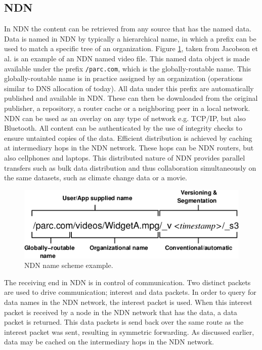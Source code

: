 

\subsection{NDN}
\label{overview-ndn}
In NDN the content can be retrieved from any source that has the named data. Data is named in NDN by typically a hierarchical name, in which a prefix can be used to match a specific tree of an organization.  Figure \ref{fig:ndn_name}, taken from Jacobson et al. \cite{jacobson2009networking} is an example of an NDN named video file. This named data object is made available under the prefix \texttt{/parc.com}, which is the globally-routable name. This globally-routable name is in practice assigned by an organization (operations similar to DNS allocation of today). All data under this prefix are automatically published and available in NDN. These can then be downloaded from the original publisher, a repository, a router cache or a neighboring peer in a local network. NDN can be used as an overlay on any type of network e.g. TCP/IP, but also Bluetooth. All content can be authenticated by the use of integrity checks to ensure untainted copies of the data. Efficient distribution is achieved by caching at intermediary hops in the NDN network. These hops can be NDN routers, but also cellphones and laptops. This distributed nature of NDN provides parallel transfers such as bulk data distribution and thus collaboration simultaneously on the same datasets, such as climate change data or a movie.

\begin{figure}[H]
\centering
\includegraphics[width=\columnwidth/2]{Images/ndn_name.png}
\caption{NDN name scheme example.}
\label{fig:ndn_name}
\end{figure}

The receiving end in NDN is in control of communication. Two distinct packets are used to drive communication; interest and data packets. In order to query for data names in the NDN network, the interest packet is used. When this interest packet is received by a node in the NDN network that has the data, a data packet is returned. This data packets is send back over the same route as the interest packet was sent, resulting in symmetric forwarding. As discussed earlier, data may be cached on the intermediary hops in the NDN network.

